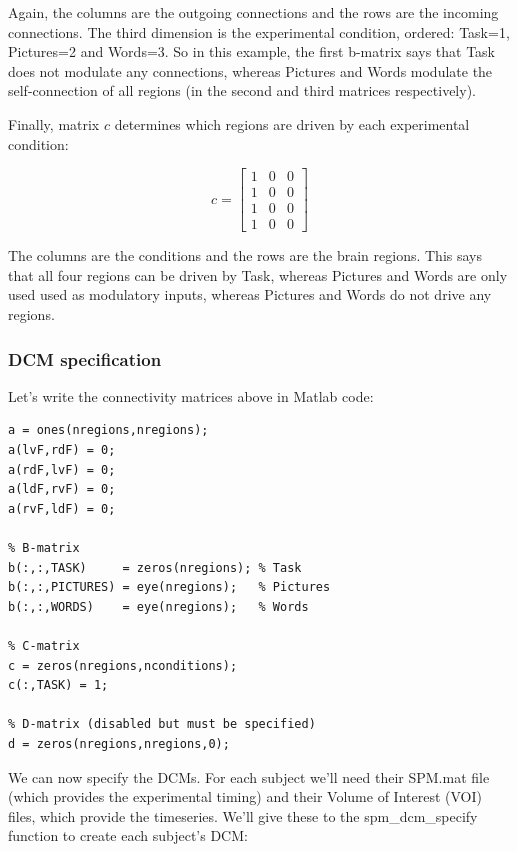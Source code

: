 \documentclass{article}
\begin{document}
Again, the columns are the outgoing connections and the rows are the incoming connections. The third dimension is the experimental condition, ordered: Task=1, Pictures=2 and Words=3. So in this example, the first b-matrix says that Task does not modulate any connections, whereas Pictures and Words modulate the self-connection of all regions (in the second and third matrices respectively). 

Finally, matrix \(c\) determines which regions are driven by each experimental condition:

\[
c=\begin{bmatrix}
  1 & 0 & 0 \\
  1 & 0 & 0 \\
  1 & 0 & 0 \\
  1 & 0 & 0
 \end{bmatrix} 
\]

The columns are the conditions and the rows are the brain regions. This says that all four regions can be driven by Task, whereas Pictures and Words are only used used as modulatory inputs, whereas Pictures and Words do not drive any regions.

\subsubsection{DCM specification}
Let's write the connectivity matrices above in Matlab code:

\begin{lstlisting}[style=Matlab-editor,caption=Connectivity matrices]
% A-matrix (on / off)
a = ones(nregions,nregions);
a(lvF,rdF) = 0;
a(rdF,lvF) = 0;
a(ldF,rvF) = 0;
a(rvF,ldF) = 0;

% B-matrix
b(:,:,TASK)     = zeros(nregions); % Task
b(:,:,PICTURES) = eye(nregions);   % Pictures
b(:,:,WORDS)    = eye(nregions);   % Words

% C-matrix
c = zeros(nregions,nconditions);
c(:,TASK) = 1;

% D-matrix (disabled but must be specified)
d = zeros(nregions,nregions,0);
\end{lstlisting}

We can now specify the DCMs. For each subject we'll need their SPM.mat file (which provides the experimental timing) and their Volume of Interest (VOI) files, which provide the timeseries. We'll give these to the spm\_dcm\_specify function to create each subject's DCM:
\end{document}
